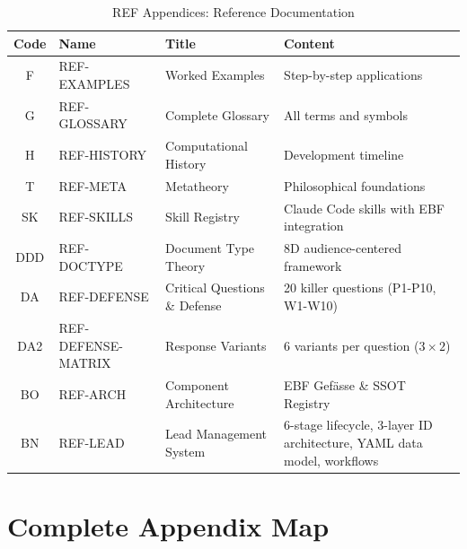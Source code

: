\begin{table}[htbp]
\centering
\caption{REF Appendices: Reference Documentation}
\label{tab:index-ref}
\renewcommand{\arraystretch}{1.4}
\begin{tabular}{@{}clll@{}}
\toprule
\textbf{Code} & \textbf{Name} & \textbf{Title} & \textbf{Content} \\
\midrule
F & REF-EXAMPLES & Worked Examples & Step-by-step applications \\
G & REF-GLOSSARY & Complete Glossary & All terms and symbols \\
H & REF-HISTORY & Computational History & Development timeline \\
T & REF-META & Metatheory & Philosophical foundations \\
SK & REF-SKILLS & Skill Registry & Claude Code skills with EBF integration \\
DDD & REF-DOCTYPE & Document Type Theory & 8D audience-centered framework \\
DA & REF-DEFENSE & Critical Questions \& Defense & 20 killer questions (P1-P10, W1-W10) \\
DA2 & REF-DEFENSE-MATRIX & Response Variants & 6 variants per question ($3 \times 2$) \\
BO & REF-ARCH & Component Architecture & EBF Gefässe \& SSOT Registry \\
BN & REF-LEAD & Lead Management System & 6-stage lifecycle, 3-layer ID architecture, YAML data model, workflows \\
\bottomrule
\end{tabular}
\end{table}

\section{Complete Appendix Map}
\label{sec:index-complete}

